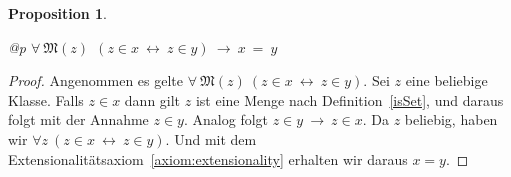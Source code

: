 \documentclass[a4paper,german,10pt,twoside]{book}
\newtheorem{prop}[thm]{Proposition}
\theoremstyle{definition}
\theoremstyle{remark}
\begin{document}
\begin{prop}
\label{module1:theorem} \hypertarget{module1:theorem}{}
\mbox{}
\begin{longtable}{{@{\extracolsep{\fill}}p{\linewidth}}}
\centering $\forall \ \mathfrak{M}(z)\ \ (z \in x\ \leftrightarrow \ z \in y)\ \rightarrow \ x \ =  \ y$
\end{longtable}

\end{prop}
\begin{proof}
Angenommen es gelte $\forall \ \mathfrak{M}(z) \ ( z \in x \ \leftrightarrow \ z \in y)$. Sei $z$ eine beliebige Klasse. Falls $z \in x$ dann gilt $z$ ist eine Menge nach Definition~\ref{isSet}, und daraus folgt mit der Annahme $z \in y$. Analog folgt $z \in y \ \rightarrow \ z \in x$. Da $z$ beliebig, haben wir $\forall z \ (z \in x \ \leftrightarrow \ z \in y)$. Und mit dem Extensionalit{\"a}tsaxiom~\ref{axiom:extensionality} erhalten wir daraus $x = y$.
\end{proof}






\backmatter

 \printindex
\end{document}
